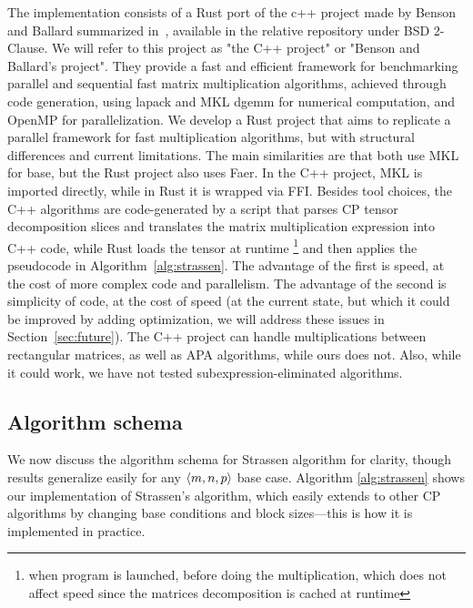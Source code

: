 \documentclass[a4paper, leqno, 11pt]{article}
\theoremstyle{definition}
\theoremstyle{remark}
\theoremstyle{experimental}
\begin{document}
The implementation consists of a Rust port of the c++ project made by Benson and Ballard
summarized in~\cite{bensonballard2015}, available in the relative repository under BSD 2-Clause. We
will refer to this project as "the C++ project" or "Benson and Ballard's project".
They provide a fast and efficient framework for benchmarking parallel and sequential fast matrix
multiplication algorithms, achieved through code generation, using lapack and MKL dgemm for numerical
computation, and OpenMP for parallelization. We develop a Rust project that aims to replicate a
parallel framework for fast multiplication algorithms, but with structural differences and current limitations. The main similarities are that both use MKL for base, 
but the Rust project also uses Faer. In the C++ project, MKL is imported directly, while
in Rust it is wrapped via FFI.
Besides tool choices, the C++ algorithms are code-generated by a script that parses CP tensor decomposition slices and
translates the matrix multiplication expression into C++ code, while Rust loads the tensor at
runtime \footnote{when
program is launched, before doing the multiplication, which does not affect speed since the matrices
decomposition is cached at runtime} and then applies the pseudocode in
Algorithm~\ref{alg:strassen}. The advantage of the first is
speed, at the cost of more complex code and parallelism. The advantage of the second is simplicity
of code, at the cost of speed (at the current state, but which it could be improved by adding
optimization, we will address these issues in Section~\ref{sec:future}). The C++ project can handle multiplications between rectangular matrices, 
as well as APA algorithms, while ours does not. Also, while it could work, we have not tested subexpression-eliminated algorithms. 


\subsection{Algorithm schema}

We now discuss the algorithm schema for Strassen algorithm for clarity, though results generalize
easily for any $ \angb{m,n,p} $ base case. Algorithm \ref{alg:strassen} shows our implementation of
Strassen's algorithm, which easily extends to other CP algorithms by changing base conditions and
block sizes---this is how it is implemented in practice.
\end{document}
